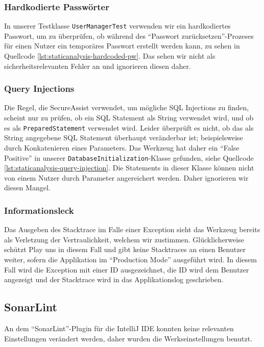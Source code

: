 \documentclass[12pt,DIV14,BCOR10mm,a4paper,parskip=half-,headsepline,headinclude,english,ngerman,bibliography=totocnumbered]{scrreprt}
\begin{document}
\subsubsection{Hardkodierte Passwörter}

In unserer Testklasse \texttt{UserManagerTest} verwenden wir ein hardkodiertes Passwort, um zu überprüfen, ob während des \enquote{Passwort zurücksetzen}-Prozeses für einen Nutzer ein temporäres Passwort erstellt werden kann, zu sehen in Quellcode \ref{lst:staticanalysis-hardcoded-pw}.
Das sehen wir nicht als sicherheitsrelevanten Fehler an und ignorieren diesen daher.

\subsubsection{Query Injections}

Die Regel, die SecureAssist verwendet, um mögliche SQL Injections zu finden, scheint nur zu prüfen, ob ein SQL Statement als String verwendet wird, und ob es als \texttt{Prepared\-Statement} verwendet wird.
Leider überprüft es nicht, ob das als String angegebene SQL Statement überhaupt veränderbar ist; beispielsweise durch Konkatenieren eines Parameters.
Das Werkzeug hat daher ein \enquote{False Positive} in unserer \texttt{Database\-Initialization}-Klasse gefunden, siehe Quellcode \ref{lst:staticanalysis-query-injection}.
Die Statements in dieser Klasse können nicht von einem Nutzer durch Parameter angereichert werden. Daher ignorieren wir diesen Mangel.

\subsubsection{Informationsleck}

Das Ausgeben des Stacktrace im Falle einer Exception sieht das Werkzeug bereits als Verletzung der Vertraulichkeit, welchem wir zustimmen.
Glücklicherweise schützt Play uns in diesem Fall und gibt keine Stacktraces an einen Benutzer weiter, sofern die Applikation im \enquote{Production Mode} ausgeführt wird.
In diesem Fall wird die Exception mit einer ID ausgezeichnet, die ID wird dem Benutzer angezeigt und der Stacktrace wird in das Applikationslog geschrieben.

\subsection{SonarLint}

An dem \enquote{SonarLint}-Plugin für die IntelliJ IDE konnten keine relevanten Einstellungen verändert werden, daher wurden die Werkseinstellungen benutzt.
\end{document}
